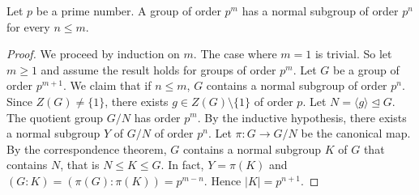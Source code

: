 \begin{theorem}
    Let $p$ be a prime number. 
    A group of order $p^m$ has a normal subgroup of order
    $p^n$ for every $n\leq m$.
\end{theorem}

\begin{proof}
    We proceed by induction on $m$. The case where $m=1$ is trivial. So let $m\geq1$ and 
    assume the result holds for groups of order $p^m$. Let
    $G$ be a group of order $p^{m+1}$.
    We claim that if $n\leq m$, $G$ contains a normal subgroup of
    order $p^n$. Since $Z(G)\ne\{1\}$, there exists
    $g\in Z(G)\setminus\{1\}$ of order $p$. Let
$N=\langle g\rangle\unlhd G$. The quotient 
group $G/N$ has order $p^m$. By the inductive hypothesis, 
there exists a normal subgroup $Y$ of $G/N$ of order $p^n$. Let 
$\pi\colon G\to G/N$ be the canonical map. 
By the correspondence theorem, $G$ contains a normal subgroup $K$ of $G$ 
that contains $N$, that is $N\leq K\leq G$. In fact, 
$Y=\pi(K)$ and 
$(G:K)=(\pi(G):\pi(K))=p^{m-n}$. Hence $|K|=p^{n+1}$.
\end{proof}
